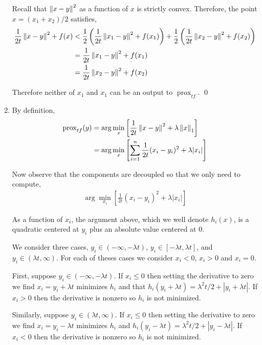 \documentclass[10pt]{article}
\newcommand{\prox}{\operatorname{prox}}
\begin{document}
\begin{solution}[Solution]
\begin{enumerate}[label=(\alph*)]
        Recall that \( \left\lVert x-y\right\rVert^2 \) as a function of \( x \) is strictly convex. Therefore, the point \( x = (x_1 + x_2)/2 \) satisfies,
        \begin{align*}
            \frac{1}{2t} \left\lVert x-y\right\rVert^2 + f(x) 
            &< \frac{1}{2} \left( \frac{1}{2t} \left\lVert x_1-y\right\rVert^2 + f(x_1) \right) + \frac{1}{2} \left( \frac{1}{2t} \left\lVert x_2-y\right\rVert^2 + f(x_2) \right)
            \\&= \frac{1}{2t} \left\lVert x_1-y\right\rVert^2 + f(x_1)
            \\&= \frac{1}{2t} \left\lVert x_2-y\right\rVert^2 + f(x_2)
        \end{align*}
        
        Therefore neither of \( x_1 \) and \( x_1 \) can be an output to \( \prox_{tf} \). \qed
        
    \item 
        By definition,
        \begin{align*}
            \prox_{tf}(y) 
            &= \arg\min_x \left[ \frac{1}{2t} \norm{x-y}^2 + \lambda\norm{x}_1 \right]
            \\&= \arg\min_x \left[ \sum_{i=1}^{n} \frac{1}{2t} (x_i-y_i)^2 + \lambda|x_i| \right]
        \end{align*}
       
        Now observe that the components are decoupled so that we only need to compute,
        \begin{align*}
            \arg\min_{x_i} \left[ \frac{1}{2t} (x_i-y_i)^2 + \lambda|x_i| \right]
        \end{align*}

        As a function of \( x_i \), the argument above, which we well denote \( h_i(x) \), is a quadratic centered at \( y_i \) plus an absolute value centered at 0.


        We consider three cases, \( y_i \in(-\infty, -\lambda t) \), \( y_i \in [-\lambda t, \lambda t] \), and \( y_i \in (\lambda t, \infty) \). For each of theses cases we consider \( x_i < 0 \), \( x_i > 0 \) and \( x_i = 0 \). 

        First, suppose \( y_i \in (-\infty, -\lambda t) \). If \( x_i \leq 0 \) then setting the derivative to zero we find \( x_i = y_i+\lambda t \) minimizes \( h_i \) and that \( h_i(y_i+\lambda t) = \lambda^2t/2+|y_i+\lambda t| \). If \( x_i > 0 \) then the derivative is nonzero so \( h_i \) is not minimized.

        Similarly, suppose \( y_i \in (\lambda t, \infty) \). If \( x_i \leq 0 \) then setting the derivative to zero we find \( x_i = y_i-\lambda t \) minimizes \( h_i \) and \( h_i(y_i-\lambda t) = \lambda^2t/2+|y_i-\lambda t| \). If \( x_i < 0 \) then the derivative is nonzero so \( h_i \) is not minimized.



\end{enumerate}
\end{solution}
\end{document}
